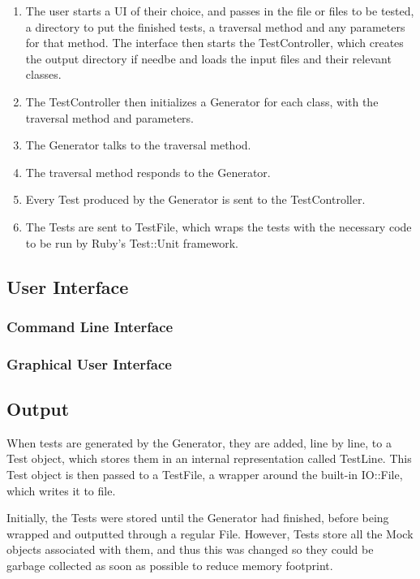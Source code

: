   \begin{enumerate}
  \small
  \item The user starts a UI of their choice, and passes in the file or files to be tested, a directory to put the finished tests, a traversal method and any parameters for that method.
    The interface then starts the TestController, which creates the output directory if needbe and loads the input files and their relevant classes.
  \item The TestController then initializes a Generator for each class, with the traversal method and parameters.
  \item The Generator talks to the traversal method.
  \item The traversal method responds to the Generator.
  \item Every Test produced by the Generator is sent to the TestController.
  \item The Tests are sent to TestFile, which wraps the tests with the necessary code to be run by Ruby's Test::Unit framework.
  \end{enumerate}
  
  \subsection{User Interface}
  \subsubsection{Command Line Interface}
  \subsubsection{Graphical User Interface}
  \begin{center}
  \end{center}

  \subsection{Output}
    When tests are generated by the Generator, they are added, line by line, to a Test object, which stores them in an internal representation called TestLine.
    This Test object is then passed to a TestFile, a wrapper around the built-in IO::File, which writes it to file.

    Initially, the Tests were stored until the Generator had finished, before being wrapped and outputted through a regular File.
    However, Tests store all the Mock objects associated with them, and thus this was changed so they could be garbage collected as soon as possible to reduce memory footprint.
    
    
